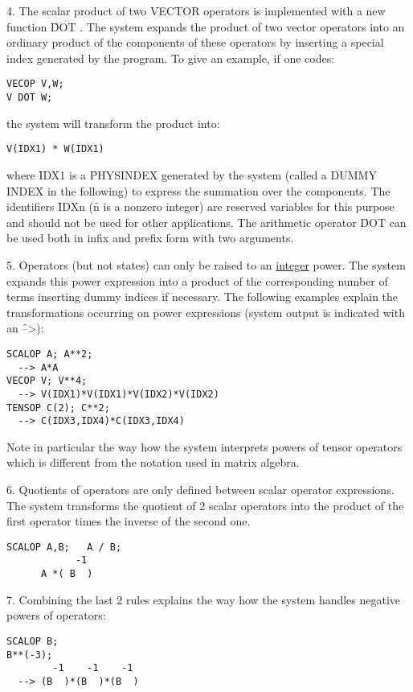 \documentclass[11pt,letterpaper]{book}
\makeatletter
\newcommand{\underscore}{\_}
\newcommand{\ttindex}[1]{{\renewcommand{\_}{\protect\underscore}%
                          \index{#1@{\tt #1}}}}
\makeatother
\begin{document}
4. The scalar product of two VECTOR operators is implemented
      with a new function \f{DOT}\ttindex{DOT}. The system expands
the product of
two vector operators into an ordinary product of the components of these
operators by inserting a special index generated by the program.
To give an example, if one codes:
{\small\begin{verbatim}
VECOP V,W;
V DOT W;
\end{verbatim}}
the system will transform the product into:
{\small\begin{verbatim}
V(IDX1) * W(IDX1)
\end{verbatim}}
where \f{IDX1} is a \f{PHYSINDEX} generated by the system (called a
DUMMY INDEX in the following) to express the summation over the
components.  The identifiers \f{IDXn} (\f{n} is a nonzero integer) are
reserved variables for this purpose and should not be used for other
applications. The arithmetic operator
\f{DOT} can be used both in infix and prefix form with two arguments.

5. Operators (but not states) can only be raised to an
\underline{integer} power. The system expands this power
expression into a product of the corresponding number of terms
inserting dummy indices if necessary. The following examples explain
the transformations occurring on power expressions (system output
is indicated with an \f{-->}):
{\small\begin{verbatim}
SCALOP A; A**2;
  --> A*A
VECOP V; V**4;
  --> V(IDX1)*V(IDX1)*V(IDX2)*V(IDX2)
TENSOP C(2); C**2;
  --> C(IDX3,IDX4)*C(IDX3,IDX4)
\end{verbatim}}
Note in particular the way how the system interprets powers of
tensor operators which is different from the notation used in matrix
algebra.

6. Quotients of operators are only defined between
scalar operator expressions.
The system transforms the quotient of 2 scalar operators into the
product of the first operator times the inverse of the second one.

{\small\begin{verbatim}
SCALOP A,B;   A / B;
            -1
      A *( B  )
\end{verbatim}}

7. Combining the  last 2 rules explains the way how the system
handles negative powers of operators:

\noindent
{\small\begin{verbatim}
SCALOP B;
B**(-3);
        -1    -1    -1
  --> (B  )*(B  )*(B  )
\end{verbatim}}
\end{document}
